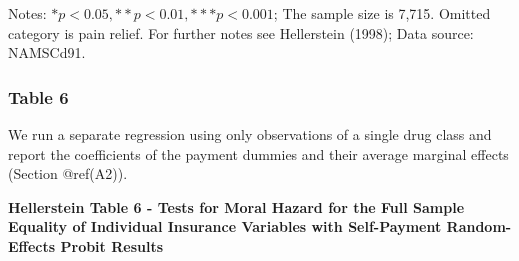 \documentclass[
]{book}
\begin{document}
Notes: \(*p < 0.05, **p < 0.01, ***p < 0.001\); The sample size is
7,715. Omitted category is pain relief. For further notes see
Hellerstein (1998); Data source: NAMSCd91.

\hypertarget{table-6}{%
\subsubsection{Table 6}\label{table-6}}

We run a separate regression using only observations of a single drug
class and report the coefficients of the payment dummies and their
average marginal effects (Section @ref(A2)).

\textbf{Hellerstein Table 6 - Tests for Moral Hazard for the Full Sample
Equality of Individual Insurance Variables with Self-Payment
Random-Effects Probit Results}
\end{document}
